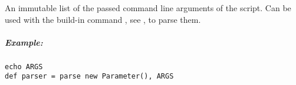 \label{par:args}

An immutable list of the passed command line arguments of the script.
Can be used with the build-in command , see ,
to parse them.

\subparagraph{Example:}

\begin{lstlisting}[style=Groovybash, label={lst:example_args_echo}]
echo ARGS
def parser = parse new Parameter(), ARGS
\end{lstlisting}

